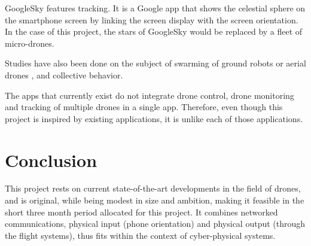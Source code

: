 \documentclass[10pt,letterpaper]{article}
\begin{document}
GoogleSky \cite{GoogleSky} features tracking. It is a Google app that shows  the celestial sphere on the smartphone screen by linking the screen display with the screen orientation. In the case of this project, the stars of GoogleSky would be replaced by a fleet of micro-drones. 

Studies have also been done on the subject of swarming of ground robots or aerial drones \cite{Vasarhelyi14}, and collective behavior.

The apps that currently exist do not integrate drone control, drone monitoring and tracking of multiple drones in a single app. Therefore, even though this project is inspired by existing applications, it is unlike each of those applications.

\section*{Conclusion}
This project rests on current state-of-the-art developments in the field of drones, and is original, while being modest in size and ambition, making it feasible in the short three month period allocated for this project. It combines networked communications, physical input (phone orientation) and physical output (through the flight systems), thus fits within the context of cyber-physical systems. 



\end{document}
